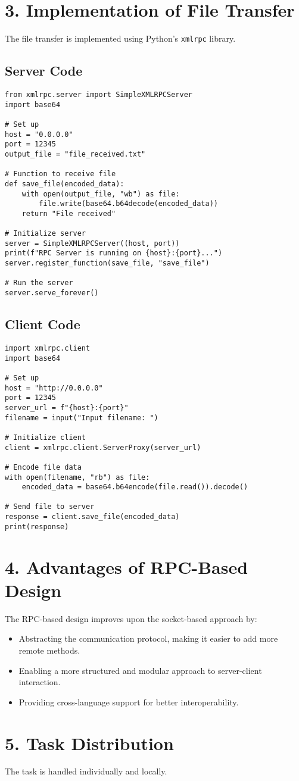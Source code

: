 \documentclass[12pt]{article}
\begin{document}
\section*{3. Implementation of File Transfer}

The file transfer is implemented using Python's \texttt{xmlrpc} library. 

\subsection*{Server Code}
\begin{lstlisting}
from xmlrpc.server import SimpleXMLRPCServer
import base64

# Set up
host = "0.0.0.0"
port = 12345
output_file = "file_received.txt"

# Function to receive file
def save_file(encoded_data):
    with open(output_file, "wb") as file:
        file.write(base64.b64decode(encoded_data))
    return "File received"

# Initialize server
server = SimpleXMLRPCServer((host, port))
print(f"RPC Server is running on {host}:{port}...")
server.register_function(save_file, "save_file")

# Run the server
server.serve_forever()
\end{lstlisting}

\subsection*{Client Code}
\begin{lstlisting}
import xmlrpc.client
import base64

# Set up
host = "http://0.0.0.0"
port = 12345
server_url = f"{host}:{port}"
filename = input("Input filename: ")

# Initialize client
client = xmlrpc.client.ServerProxy(server_url)

# Encode file data
with open(filename, "rb") as file:
    encoded_data = base64.b64encode(file.read()).decode()

# Send file to server
response = client.save_file(encoded_data)
print(response)
\end{lstlisting}

\section*{4. Advantages of RPC-Based Design}

The RPC-based design improves upon the socket-based approach by:
\begin{itemize}
    \item Abstracting the communication protocol, making it easier to add more remote methods.
    \item Enabling a more structured and modular approach to server-client interaction.
    \item Providing cross-language support for better interoperability.
\end{itemize}

\section*{5. Task Distribution}

The task is handled individually and locally.
\end{document}
